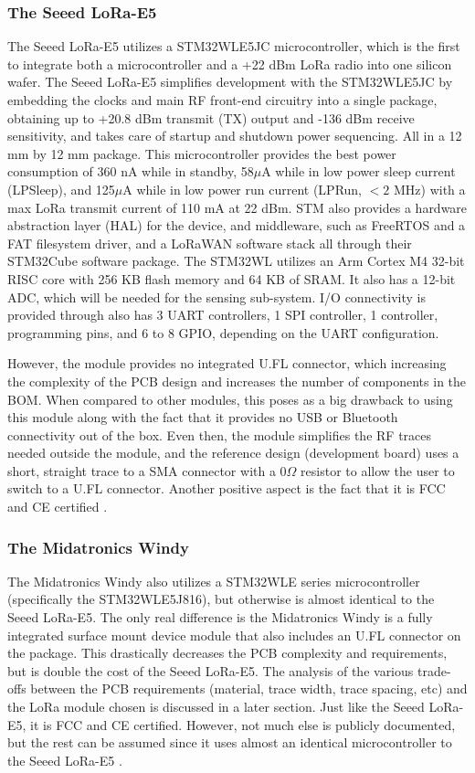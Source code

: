 \subsubsection{The Seeed LoRa-E5}
The Seeed LoRa-E5 utilizes a STM32WLE5JC microcontroller, which is the first to
integrate both a microcontroller and a +22 dBm LoRa radio into one silicon wafer.
The Seeed LoRa-E5 simplifies development with the STM32WLE5JC by embedding the
clocks and main RF front-end circuitry into a single package, obtaining up to
+20.8 dBm transmit (TX) output and -136 dBm receive sensitivity, and takes care
of startup and shutdown power sequencing. All in a 12 mm by 12 mm package. This
microcontroller provides the best power consumption of 360 nA while in standby,
58$\mu$A while in low power sleep current (LPSleep), and 125$\mu$A while in low
power run current (LPRun, $<2$ MHz) with a max LoRa transmit current of 110 mA at
22 dBm. STM also provides a hardware abstraction layer (HAL) for the device, and
middleware, such as FreeRTOS and a FAT filesystem driver, and a LoRaWAN
software stack all through their STM32Cube software package. The STM32WL
utilizes an Arm Cortex M4 32-bit RISC core with 256 KB flash memory and 64 KB of
SRAM. It also has a 12-bit ADC, which will be needed for the sensing
sub-system.  I/O connectivity is provided through also has 3 UART controllers,
1 SPI controller, 1 \iic controller, programming pins, and 6 to 8 GPIO,
depending on the UART configuration.

However, the module provides no integrated U.FL connector, which increasing the
complexity of the PCB design and increases the number of components in the BOM.
When compared to other modules, this poses as a big drawback to using this
module along with the fact that it provides no USB or Bluetooth connectivity out
of the box. Even then, the module simplifies the RF traces needed outside the
module, and the reference design (development board) uses a short, straight
trace to a SMA connector with a 0$\Omega$ resistor to allow the user to switch
to a U.FL connector.  Another positive aspect is the fact that it is FCC and CE
certified \cite{ds-stm32wle5j8}\cite{ds-lora-e5}.


\subsubsection{The Midatronics Windy} 
The Midatronics Windy also utilizes a STM32WLE series microcontroller
(specifically the STM32WLE5J816), but otherwise is almost identical to the Seeed
LoRa-E5. The only real difference is the Midatronics Windy is a fully integrated
surface mount device module that also includes an U.FL connector on the package.
This drastically decreases the PCB complexity and requirements, but is double
the cost of the Seeed LoRa-E5. The analysis of the various trade-offs between the
PCB requirements (material, trace width, trace spacing, etc) and the LoRa module
chosen is discussed in a later section. Just like the Seeed LoRa-E5, it is FCC
and CE certified. However, not much else is publicly documented, but the rest
can be assumed since it uses almost an identical microcontroller to the Seeed
LoRa-E5 \cite{ds-midatronics-windy}\cite{ds-midatronics-mkr-windy}\cite{ds-stm32wle5j8}.

